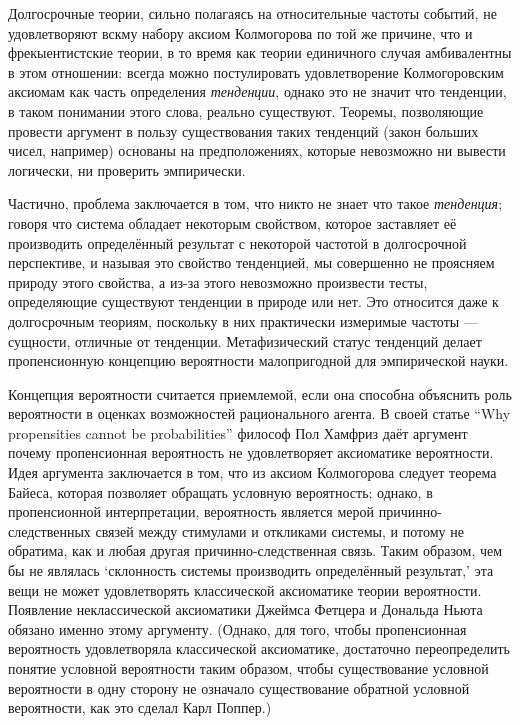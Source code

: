 \documentclass[14pt, a4paper, pdftex]{extarticle}
\begin{document}
Долгосрочные теории, сильно полагаясь на относительные частоты событий, не удовлетворяют вскму набору аксиом Колмогорова по той же причине, что и фрекыентистские теории, в то время как теории единичного случая амбивалентны в этом отношении: всегда можно постулировать удовлетворение Колмогоровским аксиомам как часть определения \emph{тенденции}, однако это не значит что тенденции, в таком понимании этого слова, реально существуют. Теоремы, позволяющие провести аргумент в пользу существования таких тенденций (закон больших чисел, например) основаны на предположениях, которые невозможно ни вывести логически, ни проверить эмпирически.

Частично, проблема заключается в том, что никто не знает что такое \emph{тенденция}; говоря что система обладает некоторым свойством, которое заставляет её производить определённый результат с некоторой частотой в долгосрочной перспективе, и называя это свойство тенденцией, мы совершенно не проясняем природу этого свойства, а из-за этого невозможно произвести тесты, определяющие существуют тенденции в природе или нет. Это относится даже к долгосрочным теориям, поскольку в них практически измеримые частоты --- сущности, отличные от тенденции. Метафизический статус тенденций делает пропенсионную концепцию вероятности малопригодной для эмпирической науки.

Концепция вероятности считается приемлемой, если она способна объяснить роль вероятности в оценках возможностей рационального агента. В своей статье ``Why propensities cannot be probabilities'' философ Пол Хамфриз даёт аргумент почему пропенсионная вероятность не удовлетворяет аксиоматике вероятности. Идея аргумента заключается в том, что из аксиом Колмогорова следует теорема Байеса, которая позволяет обращать условную вероятность; однако, в пропенсионной интерпретации, вероятность является мерой причинно-следственных связей между стимулами и откликами системы, и потому не обратима, как и любая другая причинно-следственная связь. Таким образом, чем бы не являлась `склонность системы производить определённый результат,' эта вещи не может удовлетворять классической аксиоматике теории вероятности. Появление неклассической аксиоматики Джеймса Фетцера и Дональда Ньюта обязано именно этому аргументу. (Однако, для того, чтобы пропенсионная вероятность удовлетворяла классической аксиоматике, достаточно переопределить понятие условной вероятности таким образом, чтобы существование условной вероятности в одну сторону не означало существование обратной условной вероятности, как это сделал Карл Поппер.)
\end{document}
